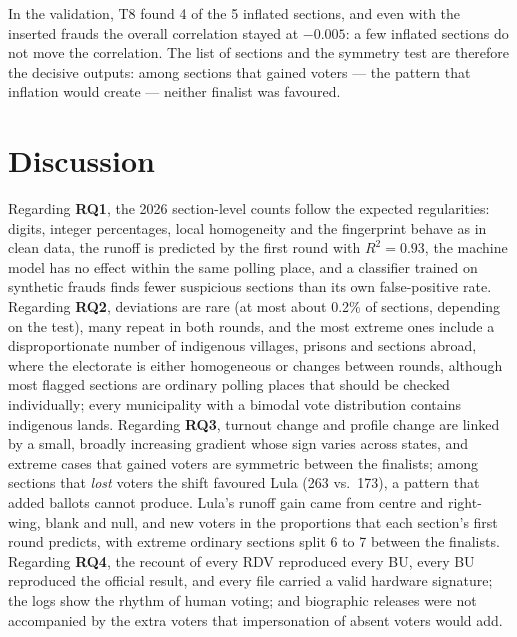 \documentclass[fleqn,10pt]{SelfArx}
\begin{document}
In the validation, T8 found 4 of the 5 inflated sections, and even with the
inserted frauds the overall correlation stayed at $-0.005$: a few inflated
sections do not move the correlation. The list of sections and the symmetry
test are therefore the decisive outputs: among sections that gained voters
--- the pattern that inflation would create --- neither finalist was
favoured.



\section{Discussion}
\label{sec:discussion}

Regarding \textbf{RQ1}, the 2026 section-level counts follow the expected
regularities: digits, integer percentages, local homogeneity and the
fingerprint behave as in clean data, the runoff is predicted by the first
round with $R^2=0.93$, the machine model has no effect within the same
polling place, and a classifier trained on synthetic frauds finds fewer
suspicious sections than its own false-positive rate. Regarding
\textbf{RQ2}, deviations are rare (at most about 0.2\% of sections,
depending on the test), many repeat in both rounds, and the most extreme
ones include a disproportionate number of indigenous villages, prisons and
sections abroad, where the electorate is either homogeneous or changes
between rounds, although most flagged sections are ordinary polling places
that should be checked individually; every municipality with a bimodal
vote distribution contains indigenous lands. Regarding \textbf{RQ3}, turnout
change and profile change are linked by a small, broadly increasing gradient whose
sign varies across states, and extreme cases that gained voters are
symmetric between the finalists; among sections that \emph{lost} voters the
shift favoured Lula (263 vs.\ 173), a pattern that added ballots cannot
produce. Lula's runoff gain came from centre and right-wing, blank and null,
and new voters in the proportions that each section's first round predicts,
with extreme ordinary sections split 6 to 7 between the finalists. Regarding \textbf{RQ4}, the recount of every RDV reproduced every
BU, every BU reproduced the official result, and every file carried a valid
hardware signature; the logs show the rhythm of human voting; and biographic
releases were not accompanied by the extra voters that impersonation of
absent voters would add.
\end{document}
